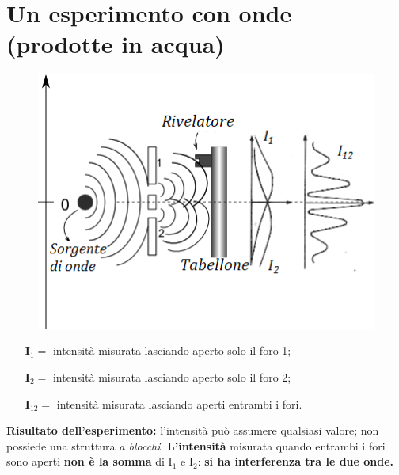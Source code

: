 \section*{Un esperimento con onde (prodotte in acqua)}
\begin{figure}[!htbp]
\begin{center}
\includegraphics[width=.6\textwidth]{immagini/cap_2/fig_2_2.png}
\end{center}
\end{figure}
\begin{itemize}
\item[\textbf{I$_1=$} ]intensità misurata lasciando aperto solo il foro 1;
\item[\textbf{I$_2=$} ]intensità misurata lasciando aperto solo il foro 2;
\item[\textbf{I$_{12}=$} ]intensità misurata lasciando aperti entrambi i fori.
\end{itemize}
\textbf{Risultato dell'esperimento:} l'intensità  può assumere qualsiasi valore; non possiede una struttura \textit{a blocchi}. \textbf{L'intensità} misurata quando entrambi i fori sono aperti \textbf{non è la somma} di I$_1$ e I$_2$: \textbf{si ha interferenza tra le due onde.}
